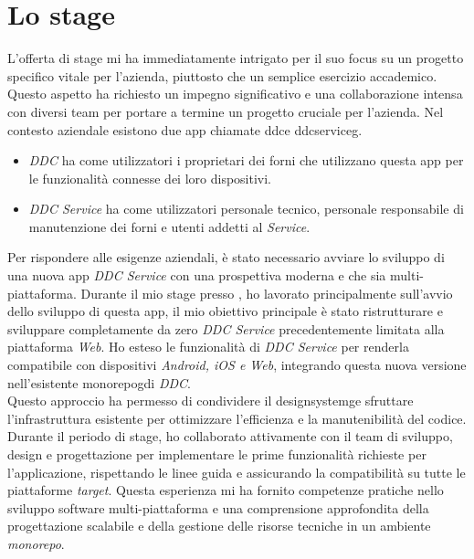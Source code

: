\section{Lo stage}
L'offerta di stage mi ha immediatamente intrigato per il suo focus su un progetto specifico vitale per l'azienda, piuttosto che un semplice esercizio accademico.
Questo aspetto ha richiesto un impegno significativo e una collaborazione intensa con diversi team per portare a termine un progetto cruciale per l'azienda.
Nel contesto aziendale esistono due app chiamate \gls{ddc}\glox e \gls{ddcserviceg}\glox.
\begin{itemize}
    \item \textit{DDC} ha come utilizzatori i proprietari dei forni che utilizzano questa app per le funzionalità connesse dei loro dispositivi.
    \item \textit{DDC Service} ha come utilizzatori personale tecnico, personale responsabile di manutenzione dei forni e utenti addetti al \textit{Service}.
\end{itemize}
Per rispondere alle esigenze aziendali, è stato necessario avviare lo sviluppo di una nuova app \textit{DDC Service} con una prospettiva moderna e che sia multi-piattaforma.
Durante il mio stage presso \myAzienda, ho lavorato principalmente sull'avvio dello sviluppo di questa app, il mio obiettivo principale è stato ristrutturare e sviluppare completamente da zero \textit{DDC Service} precedentemente limitata alla piattaforma \textit{Web}.
Ho esteso le funzionalità di \textit{DDC Service} per renderla compatibile con dispositivi \textit{Android, iOS e Web}, integrando questa nuova versione nell'esistente \gls{monorepog}\glox di \textit{DDC}.
\\Questo approccio ha permesso di condividere il \gls{designsystemg}\glox e sfruttare l'infrastruttura esistente per ottimizzare l'efficienza e la manutenibilità del codice.
\\Durante il periodo di stage, ho collaborato attivamente con il team di sviluppo, design e progettazione per implementare le prime funzionalità richieste per l'applicazione, rispettando le linee guida e assicurando la compatibilità su tutte le piattaforme \textit{target}.
Questa esperienza mi ha fornito competenze pratiche nello sviluppo software multi-piattaforma e una comprensione approfondita della progettazione scalabile e della gestione delle risorse tecniche in un ambiente \textit{monorepo}.


\newpage